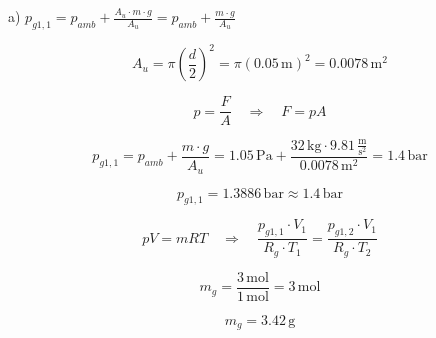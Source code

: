 a) $p_{g1,1} = p_{amb} + \frac{A_u \cdot m \cdot g}{A_u} = p_{amb} + \frac{m \cdot g}{A_u}$

\[
A_u = \pi \left(\frac{d}{2}\right)^2 = \pi \left(0.05 \, \text{m}\right)^2 = 0.0078 \, \text{m}^2
\]

\[
p = \frac{F}{A} \quad \Rightarrow \quad F = pA
\]

\[
p_{g1,1} = p_{amb} + \frac{m \cdot g}{A_u} = 1.05 \, \text{Pa} + \frac{32 \, \text{kg} \cdot 9.81 \, \frac{\text{m}}{\text{s}^2}}{0.0078 \, \text{m}^2} = 1.4 \, \text{bar}
\]

\[
p_{g1,1} = 1.3886 \, \text{bar} \approx 1.4 \, \text{bar}
\]

\[
pV = mRT \quad \Rightarrow \quad \frac{p_{g1,1} \cdot V_1}{R_g \cdot T_1} = \frac{p_{g1,2} \cdot V_1}{R_g \cdot T_2}
\]

\[
m_g = \frac{3 \, \text{mol}}{1 \, \text{mol}} = 3 \, \text{mol}
\]

\[
m_g = 3.42 \, \text{g}
\]